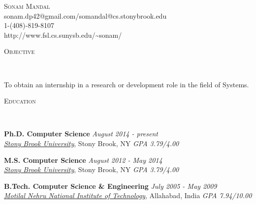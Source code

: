 \documentclass[11pt]{article}
\newenvironment{changemargin}[2]{%
  \begin{list}{}{%
    \setlength{\topsep}{0pt}%
    \setlength{\leftmargin}{#1}%
    \setlength{\rightmargin}{#2}%
    \setlength{\listparindent}{\parindent}%
    \setlength{\itemindent}{\parindent}%
    \setlength{\parsep}{\parskip}%
  }%
  \item[]}{\end{list}
}
\newcommand{\lineover}{
	\begin{changemargin}{-0.05in}{-0.05in}
		\vspace*{-8pt}
		\hrulefill \\
		\vspace*{-2pt}
	\end{changemargin}
}
\newcommand{\header}[1]{
	\begin{changemargin}{-0.5in}{-0.5in}
		\scshape{#1}\\
  	\lineover
	\end{changemargin}
}
\newcommand{\contact}[4]{
	\begin{changemargin}{-0.5in}{-0.5in}
		\begin{center}
			{\Large \scshape {#1}}\\ \smallskip
			{#2}\\ \smallskip 
			{#3}\\ \smallskip
			{#4}\smallskip
		\end{center}
	\end{changemargin}
}
\newenvironment{body} {
	\vspace*{-16pt}
	\begin{changemargin}{-0.25in}{-0.5in}
  }	
	{\end{changemargin}
}
\begin{document}
\contact{Sonam Mandal}{sonam.dp42@gmail.com/somandal@cs.stonybrook.edu}{1-(408)-819-8107}{http://www.fsl.cs.sunysb.edu/\textasciitilde sonam/}


\header{Objective}

\begin{body}
	\vspace{14pt}
	To obtain an internship in a research or development role in the field of Systems.\\
\end{body}

\smallskip






\header{Education}

\begin{body}
	\vspace{14pt}
		\textbf{Ph.D. Computer Science} \hfill \emph{August 2014 - present} \\
	\href{https://www.cs.stonybrook.edu/home}{\emph{Stony Brook University}}, Stony Brook, NY \hfill \emph{GPA 3.79/4.00}\\
\end{body}

\begin{body}
	\vspace{14pt}
		\textbf{M.S. Computer Science} \hfill \emph{August 2012 - May 2014} \\
	\href{https://www.cs.stonybrook.edu/home}{\emph{Stony Brook University}}, Stony Brook, NY \hfill \emph{GPA 3.79/4.00}\\
\end{body}

\begin{body}
	\vspace{14pt}
		\textbf{B.Tech. Computer Science \& Engineering} \hfill \emph{July 2005 - May 2009} \\
	\href{http://www.mnnit.ac.in/}{\emph{Motilal Nehru National Institute of Technology}}, Allahabad, India \hfill \emph{GPA 7.94/10.00}\\
\end{body}
\end{document}
